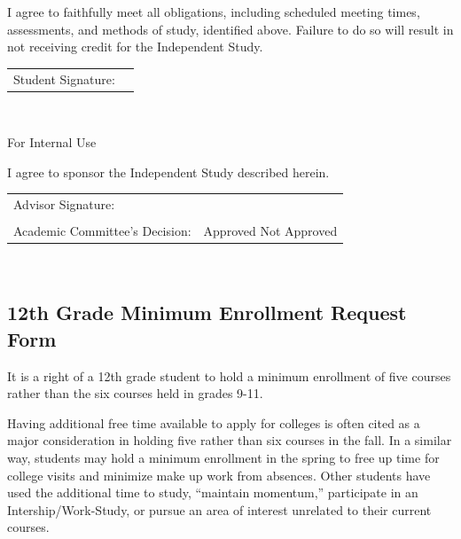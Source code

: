I agree to faithfully meet all obligations, including scheduled meeting times, assessments, and methods of study, identified above. Failure to do so will result in not receiving credit for the Independent Study. \\

\renewcommand{\arraystretch}{1}
\noindent\begin{tabular}{ll}
Student Signature:  & \underline{\hspace{7cm}}\\

\end{tabular}\\


\vspace{.5cm}

\vfill

\noindent \hrulefill For Internal Use \hrulefill 

\vspace{.5cm}

\noindent I agree to sponsor the Independent Study described herein.\\

\renewcommand{\arraystretch}{1}
\noindent\begin{tabular}{ll}
Advisor Signature:  & \underline{\hspace{7cm}}\\
&\\
Academic Committee’s Decision:	& Approved  \hspace{.5cm} 	Not Approved
\end{tabular}\\





\newpage



\subsection{12th Grade Minimum Enrollment Request Form}

It is a right of a 12th grade student to hold a minimum enrollment of five courses  rather than the six courses held in grades 9-11.

Having additional free time available to apply for colleges is often cited as a major consideration in holding five rather than six courses in the fall.  In a similar way, students may hold a minimum enrollment in the spring to free up time for college visits and minimize make up work from absences.  Other students have used the additional time to study, ``maintain momentum,'' participate in an Intership/Work-Study, or pursue an area of interest unrelated to their current courses.

